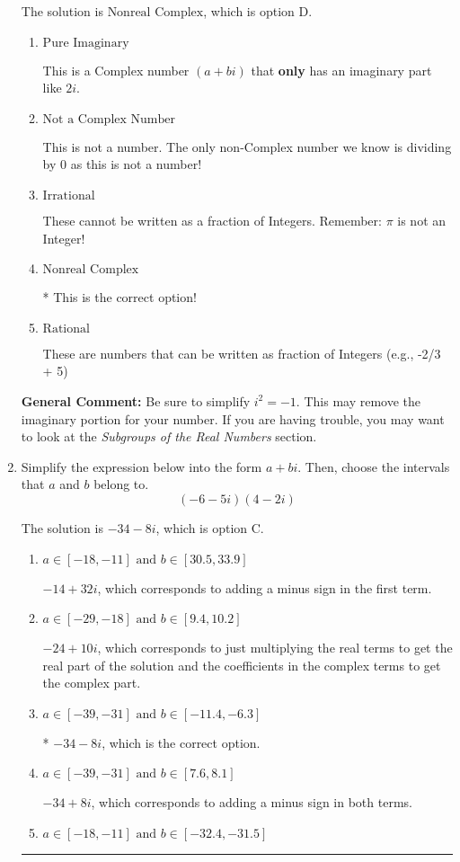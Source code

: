 \documentclass{extbook}[14pt]
\newcommand{\litem}[1]{\item #1

\rule{\textwidth}{0.4pt}}
\begin{document}
\begin{enumerate}
{The solution is \( \text{Nonreal Complex} \), which is option D.\begin{enumerate}[label=\Alph*.]
\item \( \text{Pure Imaginary} \)

This is a Complex number $(a+bi)$ that \textbf{only} has an imaginary part like $2i$.
\item \( \text{Not a Complex Number} \)

This is not a number. The only non-Complex number we know is dividing by 0 as this is not a number!
\item \( \text{Irrational} \)

These cannot be written as a fraction of Integers. Remember: $\pi$ is not an Integer!
\item \( \text{Nonreal Complex} \)

* This is the correct option!
\item \( \text{Rational} \)

These are numbers that can be written as fraction of Integers (e.g., -2/3 + 5)
\end{enumerate}

\textbf{General Comment:} Be sure to simplify $i^2 = -1$. This may remove the imaginary portion for your number. If you are having trouble, you may want to look at the \textit{Subgroups of the Real Numbers} section.
}
\litem{
Simplify the expression below into the form $a+bi$. Then, choose the intervals that $a$ and $b$ belong to.
\[ (-6 - 5 i)(4 - 2 i) \]

The solution is \( -34 - 8 i \), which is option C.\begin{enumerate}[label=\Alph*.]
\item \( a \in [-18, -11] \text{ and } b \in [30.5, 33.9] \)

 $-14 + 32 i$, which corresponds to adding a minus sign in the first term.
\item \( a \in [-29, -18] \text{ and } b \in [9.4, 10.2] \)

 $-24 + 10 i$, which corresponds to just multiplying the real terms to get the real part of the solution and the coefficients in the complex terms to get the complex part.
\item \( a \in [-39, -31] \text{ and } b \in [-11.4, -6.3] \)

* $-34 - 8 i$, which is the correct option.
\item \( a \in [-39, -31] \text{ and } b \in [7.6, 8.1] \)

 $-34 + 8 i$, which corresponds to adding a minus sign in both terms.
\item \( a \in [-18, -11] \text{ and } b \in [-32.4, -31.5] \)


\end{enumerate}}
\end{enumerate}
\end{document}
